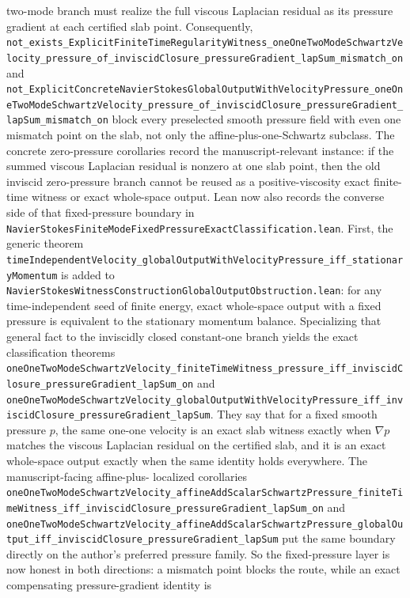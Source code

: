 \documentclass[11pt]{article}
\theoremstyle{remark}
\begin{document}
two-mode branch must realize the full viscous Laplacian residual as its
pressure gradient at each certified slab point.  Consequently,
\texttt{not\_exists\_ExplicitFiniteTimeRegularityWitness\_oneOneTwoModeSchwartzVelocity\_pressure\_of\_inviscidClosure\_pressureGradient\_lapSum\_mismatch\_on}
and
\texttt{not\_ExplicitConcreteNavierStokesGlobalOutputWithVelocityPressure\_oneOneTwoModeSchwartzVelocity\_pressure\_of\_inviscidClosure\_pressureGradient\_lapSum\_mismatch\_on}
block every preselected smooth pressure field with even one mismatch point on
the slab, not only the affine-plus-one-Schwartz subclass.  The concrete
zero-pressure corollaries record the manuscript-relevant instance: if the
summed viscous Laplacian residual is nonzero at one slab point, then the old
inviscid zero-pressure branch cannot be reused as a positive-viscosity exact
finite-time witness or exact whole-space output.
Lean now also records the converse side of that fixed-pressure boundary in
\texttt{NavierStokesFiniteModeFixedPressureExactClassification.lean}.  First,
the generic theorem
\texttt{timeIndependentVelocity\_globalOutputWithVelocityPressure\_iff\_stationaryMomentum}
is added to
\texttt{NavierStokesWitnessConstructionGlobalOutputObstruction.lean}: for any
time-independent seed of finite energy, exact whole-space output with a fixed
pressure is equivalent to the stationary momentum balance.  Specializing that
general fact to the inviscidly closed constant-one branch yields the exact
classification theorems
\texttt{oneOneTwoModeSchwartzVelocity\_finiteTimeWitness\_pressure\_iff\_inviscidClosure\_pressureGradient\_lapSum\_on}
and
\texttt{oneOneTwoModeSchwartzVelocity\_globalOutputWithVelocityPressure\_iff\_inviscidClosure\_pressureGradient\_lapSum}.
They say that for a fixed smooth pressure \(p\), the same one-one velocity is
an exact slab witness exactly when \(\nabla p\) matches the viscous Laplacian
residual on the certified slab, and it is an exact whole-space output exactly
when the same identity holds everywhere.  The manuscript-facing affine-plus-
localized corollaries
\texttt{oneOneTwoModeSchwartzVelocity\_affineAddScalarSchwartzPressure\_finiteTimeWitness\_iff\_inviscidClosure\_pressureGradient\_lapSum\_on}
and
\texttt{oneOneTwoModeSchwartzVelocity\_affineAddScalarSchwartzPressure\_globalOutput\_iff\_inviscidClosure\_pressureGradient\_lapSum}
put the same boundary directly on the author's preferred pressure family.  So
the fixed-pressure layer is now honest in both directions: a mismatch point
blocks the route, while an exact compensating pressure-gradient identity is
\end{document}
